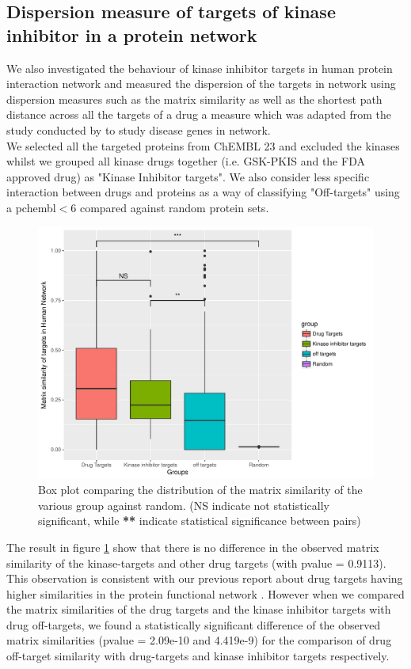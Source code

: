 \documentclass[a4paper, 11pt]{article}
\begin{document}
\subsection*{Dispersion measure of targets of kinase inhibitor in a protein network}
We also investigated the behaviour of kinase inhibitor targets in human protein interaction network and measured the dispersion of the targets in network using dispersion measures such as the matrix similarity as well as the shortest path distance across all the targets of a drug a measure which was adapted from the study conducted by \cite{menche2015uncovering} to study disease genes in network.\\
We selected all the targeted proteins from ChEMBL 23 and excluded the kinases whilst we grouped all kinase drugs together (i.e. GSK-PKIS and the FDA approved drug) as  "Kinase Inhibitor targets". We also consider less specific interaction between drugs and proteins as a way of classifying "Off-targets" using a pchembl$<$6 compared against random protein sets.
\begin{figure}[H]
	\includegraphics[width=\linewidth]{figures/simplotk.pdf}
	\centering
	\caption{Box plot comparing the distribution of the matrix similarity of the various group against random. (NS indicate not statistically significant, while \textbf{**} indicate statistical significance between pairs)}
		\label{ksim_targets}
\end{figure}
The result in figure \ref{ksim_targets} show that there is no difference in the observed matrix similarity of the kinase-targets and other drug targets (with pvalue = 0.9113). This observation is consistent with our previous report about drug targets having higher similarities in the protein functional network \cite{moya2017structural}. However when we compared the matrix similarities of the drug targets and the kinase inhibitor targets with drug off-targets, we found a statistically significant difference of the observed matrix similarities (pvalue = 2.09e-10 and 4.419e-9) for the comparison of drug off-target similarity with drug-targets and kinase inhibitor targets respectively.\par
\end{document}
